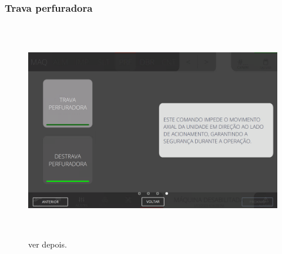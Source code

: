 \newpage
\thispagestyle{fancy}
\vspace*{\fill}
\subsubsection{\small{Trava perfuradora}}
\begin{figure}[h]
  \centering
  \includegraphics[width=576px,height=360px]{src/imagesFlexo/06-drilling/commands/e-4.png}
  \caption{ver depois.}
   \label{}
\end{figure}
\vspace*{\fill}
